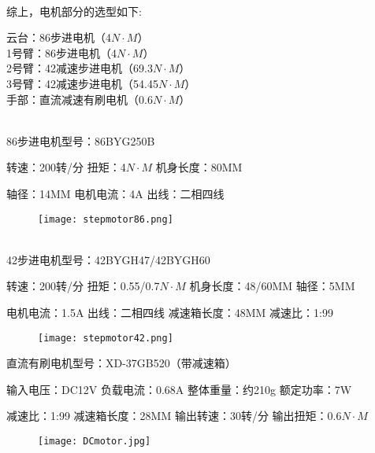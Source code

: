 ~\\

综上，电机部分的选型如下:
\begin{minipage}[t]{0.9\linewidth}
  云台：86步进电机（4$N\cdot M$）
\\1号臂：86步进电机（4$N\cdot M$）
\\2号臂：42减速步进电机（69.3$N\cdot M$）
\\3号臂：42减速步进电机（54.45$N\cdot M$）
\\手部：直流减速有刷电机（0.6$N\cdot M$）
\end{minipage}
\\


    86步进电机型号：86BYG250B 
   
    转速：200转/分   \qquad \qquad 扭矩：4$N\cdot M$ \qquad \qquad 机身长度：80MM  
     
    轴径：14MM \qquad \qquad 电机电流：4A \qquad \qquad 出线：二相四线 
    \begin{figure}[!htp]
        \centering
          \texttt{[image: stepmotor86.png]}
          \label{fig:86}
    \end{figure}
~\\

    42步进电机型号：42BYGH47/42BYGH60
     
    转速：200转/分  \qquad  扭矩：0.55/0.7$N\cdot M$ \qquad  机身长度：48/60MM  \qquad 轴径：5MM
    
    电机电流：1.5A \qquad  出线：二相四线 \qquad  减速箱长度：48MM  \qquad  减速比：1:99
    \begin{figure}[!htp]
        \centering
        \texttt{[image: stepmotor42.png]}
        \label{fig:42}
    \end{figure}



        直流有刷电机型号：XD-37GB520（带减速箱）
        
        输入电压：DC12V \qquad 负载电流：0.68A \qquad 整体重量：约210g \qquad 额定功率：7W

        减速比：1:99 \qquad 减速箱长度：28MM \qquad  输出转速：30转/分 \quad  输出扭矩：0.6$N\cdot M$
        \begin{figure}[!htp]
        \centering
        \texttt{[image: DCmotor.jpg]}
        \label{fig:DCmotor}
        \end{figure}
        

